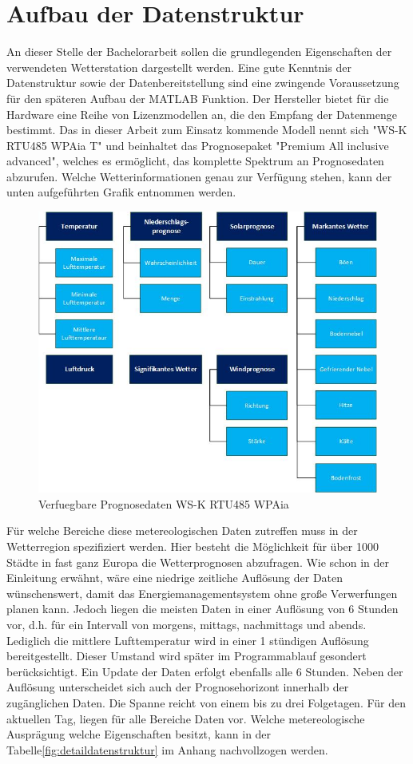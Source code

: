 \section{Aufbau der Datenstruktur}
An dieser Stelle der Bachelorarbeit sollen die grundlegenden Eigenschaften der verwendeten Wetterstation dargestellt werden. Eine gute Kenntnis der Datenstruktur sowie der Datenbereitstellung sind eine zwingende Voraussetzung für den späteren Aufbau der MATLAB Funktion. Der Hersteller bietet für die Hardware eine Reihe von Lizenzmodellen an, die den Empfang der Datenmenge bestimmt. Das in dieser Arbeit zum Einsatz kommende Modell nennt sich "{}WS-K RTU485 WPAia T"{} und beinhaltet das Prognosepaket "Premium All inclusive advanced", welches es ermöglicht, das komplette Spektrum an Prognosedaten abzurufen\cite[S. 2]{HKWDoc}. Welche Wetterinformationen genau zur Verfügung stehen, kann der unten aufgeführten Grafik entnommen werden.
\begin{figure}[h]
\centering
\includegraphics[scale=0.65]{weatherstation/Datenuebersicht}
\caption{Verfuegbare Prognosedaten WS-K RTU485 WPAia\cite[S. 5]{HKWDoc}}
\label{fig:1}
\end{figure}
Für welche Bereiche diese metereologischen Daten zutreffen muss in der Wetterregion spezifiziert werden. Hier besteht die Möglichkeit für über 1000 Städte in fast ganz Europa die Wetterprognosen abzufragen\cite[S. 27-38]{HKWDoc}. Wie schon in der Einleitung erwähnt, wäre eine niedrige zeitliche Auflösung der Daten wünschenswert, damit das Energiemanagementsystem ohne große Verwerfungen planen kann. Jedoch liegen die meisten Daten in einer Auflösung von 6 Stunden vor, d.h. für ein Intervall von morgens, mittags, nachmittags und abends. Lediglich die mittlere Lufttemperatur wird in einer 1 stündigen Auflösung bereitgestellt. Dieser Umstand wird später im Programmablauf gesondert berücksichtigt. Ein Update der Daten erfolgt ebenfalls alle 6 Stunden. Neben der Auflösung unterscheidet sich auch der Prognosehorizont innerhalb der zugänglichen Daten. Die Spanne reicht von einem bis zu drei Folgetagen. Für den aktuellen Tag, liegen für alle Bereiche Daten vor. Welche metereologische Ausprägung welche Eigenschaften besitzt, kann in der Tabelle\ref{fig:detaildatenstruktur} im Anhang nachvollzogen werden.    
